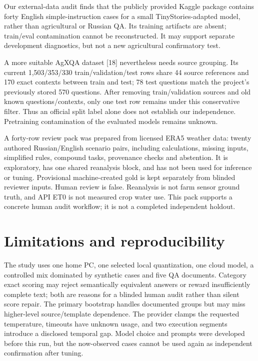 \documentclass[10pt,a4paper,twocolumn]{article}
\begin{document}
Our external-data audit finds that the publicly provided Kaggle package contains forty English simple-instruction cases for a small TinyStories-adapted model, rather than agricultural or Russian QA. Its training artifacts are absent; train/eval contamination cannot be reconstructed. It may support separate development diagnostics, but not a new agricultural confirmatory test.

A more suitable AgXQA dataset [18] nevertheless needs source grouping. Its current 1,503/353/330 train/validation/test rows share 44 source references and 170 exact contexts between train and test; 78 test questions match the project's previously stored 570 questions. After removing train/validation sources and old known questions/contexts, only one test row remains under this conservative filter. Thus an official split label alone does not establish our independence. Pretraining contamination of the evaluated models remains unknown.

A forty-row review pack was prepared from licensed ERA5 weather data: twenty authored Russian/English scenario pairs, including calculations, missing inputs, simplified rules, compound tasks, provenance checks and abstention. It is exploratory, has one shared reanalysis block, and has not been used for inference or tuning. Provisional machine-created gold is kept separately from blinded reviewer inputs. Human review is false. Reanalysis is not farm sensor ground truth, and API ET0 is not measured crop water use. This pack supports a concrete human audit workflow; it is not a completed independent holdout.

\section{Limitations and reproducibility}

The study uses one home PC, one selected local quantization, one cloud model, a controlled mix dominated by synthetic cases and five QA documents. Category exact scoring may reject semantically equivalent answers or reward insufficiently complete text; both are reasons for a blinded human audit rather than silent score repair. The primary bootstrap handles documented groups but may miss higher-level source/template dependence. The provider clamps the requested temperature, timeouts have unknown usage, and two execution segments introduce a disclosed temporal gap. Model choice and prompts were developed before this run, but the now-observed cases cannot be used again as independent confirmation after tuning.
\end{document}
